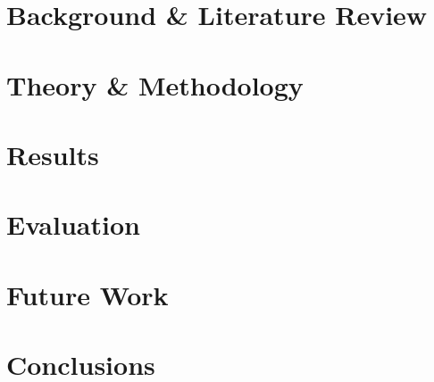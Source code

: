 \section{Background \& Literature Review}
\section{Theory \& Methodology}
\section{Results}
\section{Evaluation}
\section{Future Work}
\section{Conclusions}
